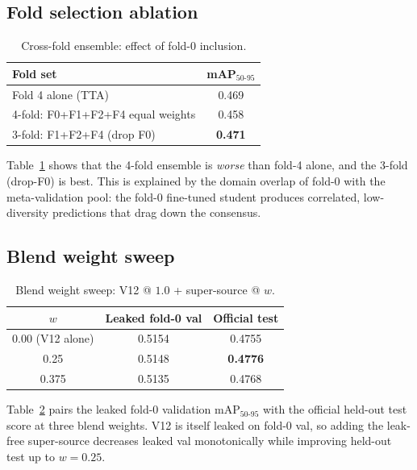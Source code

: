 \documentclass{article}
\begin{document}
\subsection{Fold selection ablation}

\begin{table}[t]
\centering
\caption{Cross-fold ensemble: effect of fold-0 inclusion.}
\label{tab:folds}
\small
\begin{tabular}{lc}
\toprule
\textbf{Fold set} & \textbf{mAP$_{50\text{-}95}$} \\
\midrule
Fold 4 alone (TTA)                & 0.469 \\
4-fold: F0+F1+F2+F4 equal weights & 0.458 \\
3-fold: F1+F2+F4 (drop F0)        & \textbf{0.471} \\
\bottomrule
\end{tabular}
\end{table}

Table~\ref{tab:folds} shows that the 4-fold ensemble is \emph{worse}
than fold-4 alone, and the 3-fold (drop-F0) is best. This is
explained by the domain overlap of fold-0 with the meta-validation
pool: the fold-0 fine-tuned student produces correlated, low-diversity
predictions that drag down the consensus.

\subsection{Blend weight sweep}

\begin{table}[t]
\centering
\caption{Blend weight sweep: V12 @ $1.0$ + super-source @ $w$.}
\label{tab:blend}
\small
\begin{tabular}{ccc}
\toprule
\textbf{$w$} & \textbf{Leaked fold-0 val} & \textbf{Official test} \\
\midrule
0.00 (V12 alone) & 0.5154 & 0.4755 \\
0.25             & 0.5148 & \textbf{0.4776} \\
0.375            & 0.5135 & 0.4768 \\
\bottomrule
\end{tabular}
\end{table}

Table~\ref{tab:blend} pairs the leaked fold-0 validation
mAP$_{50\text{-}95}$ with the official held-out test score at three
blend weights. V12 is itself leaked on fold-0 val, so adding the
leak-free super-source decreases leaked val monotonically while
improving held-out test up to $w{=}0.25$.
\end{document}
